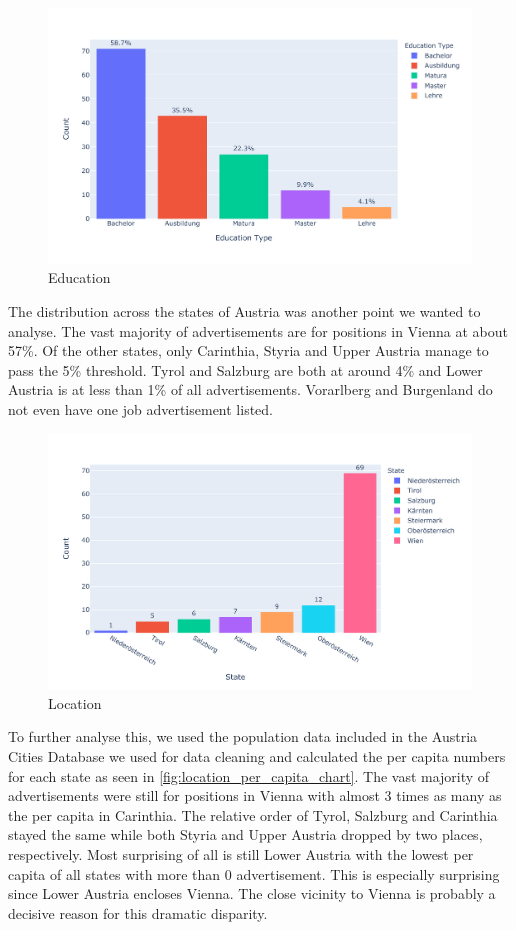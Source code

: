 \documentclass[runningheads]{llncs}
\begin{document}
\begin{figure}[H]
	\centering
  \includegraphics[width=\textwidth]{education-bar-chart.pdf}
	\caption{Education}
	\label{fig:education_chart}
\end{figure}

The distribution across the states of Austria was another point we wanted to analyse. The vast majority of advertisements are for positions in Vienna at about 57\%. Of the other states, only Carinthia, Styria and Upper Austria manage to pass the 5\% threshold. Tyrol and Salzburg are both at around 4\% and Lower Austria is at less than 1\% of all advertisements. Vorarlberg and Burgenland do not even have one job advertisement listed.

\begin{figure}[H]
	\centering
  \includegraphics[width=\textwidth]{location-bar-chart.pdf}
	\caption{Location}
	\label{fig:location_chart}
\end{figure}

To further analyse this, we used the population data included in the Austria Cities Database \cite{austria_cities_database} we used for data cleaning and calculated the per capita numbers for each state as seen in \autoref{fig:location_per_capita_chart}. The vast majority of advertisements were still for positions in Vienna with almost 3 times as many as the per capita in Carinthia. The relative order of Tyrol, Salzburg and Carinthia stayed the same while both Styria and Upper Austria dropped by two places, respectively. Most surprising of all is still Lower Austria with the lowest per capita of all states with more than 0 advertisement. This is especially surprising since Lower Austria encloses Vienna. The close vicinity to Vienna is probably a decisive reason for this dramatic disparity.
\end{document}
